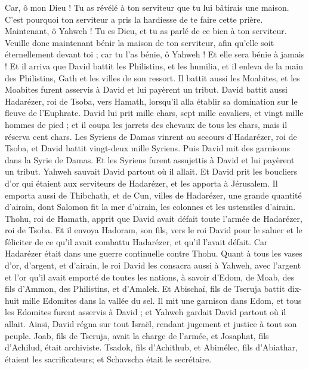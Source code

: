 \begin{multicols}{2}
Car, ô mon Dieu ! Tu as révélé à ton serviteur que tu lui bâtirais une maison. C'est pourquoi ton serviteur a pris la hardiesse de te faire cette prière.
Maintenant, ô Yahweh ! Tu es Dieu, et tu as parlé de ce bien à ton serviteur.
Veuille donc maintenant bénir la maison de ton serviteur, afin qu'elle soit éternellement devant toi ; car tu l'as bénie, ô Yahweh ! Et elle sera bénie à jamais !
\VerseOne{}Et il arriva que David battit les Philistins, et les humilia, et il enleva de la main des Philistins, Gath et les villes de son ressort.
Il battit aussi les Moabites, et les Moabites furent asservis à David et lui payèrent un tribut.
David battit aussi Hadarézer, roi de Tsoba, vers Hamath, lorsqu'il alla établir sa domination sur le fleuve de l'Euphrate.
David lui prit mille chars, sept mille cavaliers, et vingt mille hommes de pied ; et il coupa les jarrets des chevaux de tous les chars, mais il réserva cent chars.
Les Syriens de Damas vinrent au secours d'Hadarézer, roi de Tsoba, et David battit vingt-deux mille Syriens.
Puis David mit des garnisons dans la Syrie de Damas. Et les Syriens furent assujettis à David et lui payèrent un tribut. Yahweh sauvait David partout où il allait.
Et David prit les boucliers d'or qui étaient aux serviteurs de Hadarézer, et les apporta à Jérusalem.
Il emporta aussi de Thibchath, et de Cun, villes de Hadarézer, une grande quantité d'airain, dont Salomon fit la mer d'airain, les colonnes et les ustensiles d'airain.
Thohu, roi de Hamath, apprit que David avait défait toute l'armée de Hadarézer, roi de Tsoba.
Et il envoya Hadoram, son fils, vers le roi David pour le saluer et le féliciter de ce qu'il avait combattu Hadarézer, et qu'il l'avait défait. Car Hadarézer était dans une guerre continuelle contre Thohu. Quant à tous les vases d'or, d'argent, et d'airain,
le roi David les consacra aussi à Yahweh, avec l'argent et l'or qu'il avait emporté de toutes les nations, à savoir d'Edom, de Moab, des fils d'Ammon, des Philistins, et d'Amalek.
Et Abischaï, fils de Tseruja battit dix-huit mille Edomites dans la vallée du sel.
Il mit une garnison dans Edom, et tous les Edomites furent asservis à David ; et Yahweh gardait David partout où il allait.
Ainsi, David régna sur tout Israël, rendant jugement et justice à tout son peuple.
Joab, fils de Tseruja, avait la charge de l'armée, et Josaphat, fils d'Achilud, était archiviste.
Tsadok, fils d'Achithub, et Abimélec, fils d'Abiathar, étaient les sacrificateurs; et Schavscha était le secrétaire.

\end{multicols}

